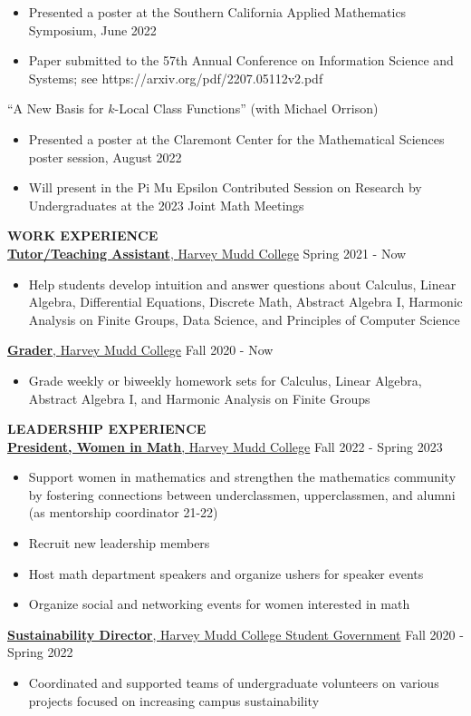 \documentclass[11pt]{article}
\newcommand{\hdr}[1]{\textcolor{blue(ryb)}{\textbf{#1}}}
\newcommand{\role}[3]{\underline{\textbf{#1}, {#2}} \hfill #3}
\begin{document}
\begin{itemize}
\item Presented a poster at the Southern California Applied Mathematics Symposium, June 2022
\item Paper submitted to the 57th Annual Conference on Information Science and Systems; see https://arxiv.org/pdf/2207.05112v2.pdf
\end{itemize}
\smallskip
``A New Basis for $k$-Local Class Functions'' (with Michael Orrison)
\begin{itemize}
\item Presented a poster at the Claremont Center for the Mathematical Sciences poster session, August 2022
\item Will present in the Pi Mu Epsilon Contributed Session on Research by Undergraduates at the 2023 Joint Math Meetings
\end{itemize}
\medskip
\hdr{WORK EXPERIENCE}\\
\role{Tutor/Teaching Assistant}{Harvey Mudd College}{Spring 2021 - Now}
\begin{itemize}
\item Help students develop intuition and answer questions about Calculus, Linear Algebra, Differential Equations, Discrete Math, Abstract Algebra I, Harmonic Analysis on Finite Groups, Data Science, and Principles of Computer Science
\end{itemize}
\smallskip
\role{Grader}{Harvey Mudd College}{Fall 2020 - Now}\\
\begin{itemize}
\item Grade weekly or biweekly homework sets for Calculus, Linear Algebra, Abstract Algebra I, and Harmonic Analysis on Finite Groups   
\end{itemize}
\bigskip
\hdr{LEADERSHIP EXPERIENCE}\\
\role{President, Women in Math}{Harvey Mudd College}{Fall 2022 - Spring 2023}
\begin{itemize}
\item Support women in mathematics and strengthen the mathematics community by fostering connections between underclassmen, upperclassmen, and alumni (as mentorship coordinator 21-22)
\item Recruit new leadership members
\item Host math department speakers and organize ushers for speaker events
\item Organize social and networking events for women interested in math
\end{itemize}
\smallskip
\role{Sustainability Director}{Harvey Mudd College Student Government}{Fall 2020 - Spring 2022}
\begin{itemize}
\item Coordinated and supported teams of undergraduate volunteers on various projects focused on increasing campus sustainability
\end{itemize}

\end{document}
